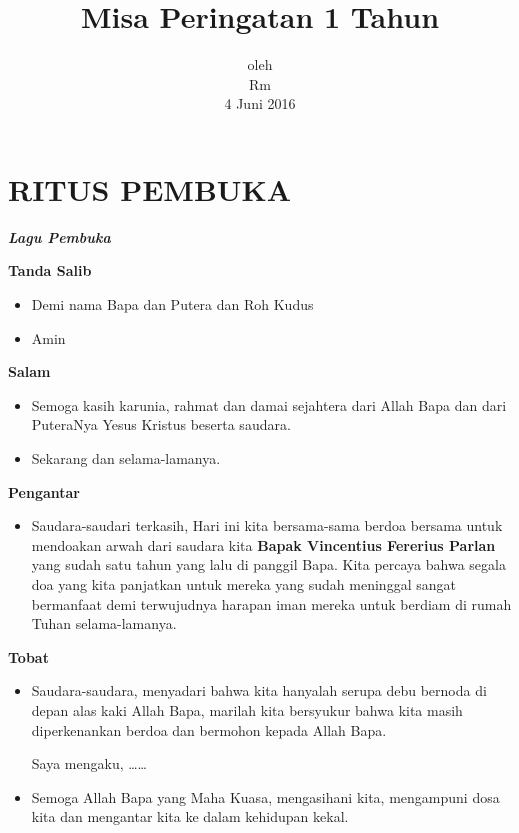 \documentclass[titlepage,10pt,openany]{scrbook}
\title{Misa Peringatan 1 Tahun}
\author{\namaalm}
\date{oleh \\ Rm \namaromo\\4 Juni 2016}
\makeatletter
\newcommand{\subjudul}[1]{%
  {\parindent \z@ 
    \interlinepenalty\@M \bfseries #1\par\nobreak \vskip 10\p@ }}
\newcommand{\lagu}[1]{%
  {\parindent \z@ 
    \interlinepenalty\@M \slshape \bfseries \normalsize \textit{#1}\par\nobreak \vskip 10\p@ }}
\newcommand{\BU}[1]{\begin{itemize} \item[U:] #1 \end{itemize}}
\newcommand{\BI}[1]{\begin{itemize} \item[I:] #1 \end{itemize}}
\newcommand{\namaalm}{Bapak Vincentius Fererius Parlan }
\newcommand{\namaromo}{Rm. F.X. Tri Priyo Widarto SCJ}
\makeatother
\begin{document}
\thispagestyle{empty}



\section*{RITUS PEMBUKA} 

 

\lagu{Lagu Pembuka}  
 

\subjudul{Tanda Salib} 

\BI{Demi nama  Bapa dan Putera dan Roh Kudus}

\BU{Amin}

 

\subjudul{Salam}

\BI{Semoga kasih karunia, rahmat dan damai sejahtera dari 
Allah Bapa dan dari PuteraNya Yesus Kristus beserta 
saudara.} 

\BU{Sekarang dan selama-lamanya.}

 

\subjudul{Pengantar}

\BI{Saudara-saudari terkasih,
Hari ini kita bersama-sama berdoa bersama untuk
mendoakan arwah dari saudara kita \textbf{\namaalm} yang sudah satu tahun
yang lalu di panggil Bapa. Kita percaya bahwa segala
doa yang kita panjatkan untuk mereka yang sudah
meninggal sangat bermanfaat demi terwujudnya harapan
iman mereka untuk berdiam di rumah Tuhan selama-lamanya.}


\subjudul{Tobat}

\BI{Saudara-saudara, menyadari bahwa kita hanyalah serupa 
debu bernoda di depan alas kaki Allah Bapa, marilah kita 
bersyukur bahwa kita masih diperkenankan berdoa dan 
bermohon kepada Allah Bapa. 

Saya mengaku, \ldots \ldots
} 



\BI{Semoga Allah Bapa yang Maha Kuasa, mengasihani kita, 
mengampuni dosa kita dan mengantar kita ke dalam 
kehidupan kekal.}
\end{document}
